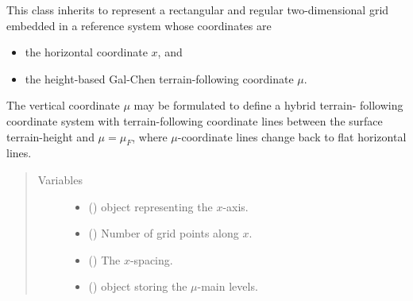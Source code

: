 \documentclass[letterpaper,10pt,english]{sphinxmanual}
\begin{document}
\begin{fulllineitems}
\label{\detokenize{api:grids.gal_chen.GalChen2d}}
This class inherits {\hyperref[\detokenize{api:grids.xz_grid.XZGrid}]{}} to represent a rectangular and regular
two-dimensional grid embedded in a reference system whose coordinates are
\begin{itemize}
\item {} 
the horizontal coordinate \(x\), and

\item {} 
the height-based Gal-Chen terrain-following coordinate \(\mu\).

\end{itemize}

The vertical coordinate \(\mu\) may be formulated to define a hybrid terrain-
following coordinate system with terrain-following coordinate lines between the
surface terrain-height and \(\mu = \mu_F\), where \(\mu\)-coordinate
lines change back to flat horizontal lines.
\begin{quote}\begin{description}
\item[{Variables}] \leavevmode\begin{itemize}
\item {} 
{\hyperref[\detokenize{api:grids.xyz_grid.XYZGrid.x}]{}} () \textendash{} {\hyperref[\detokenize{api:grids.axis.Axis}]{}} object representing the \(x\)-axis.

\item {} 
{\hyperref[\detokenize{api:grids.xyz_grid.XYZGrid.nx}]{}} () \textendash{} Number of grid points along \(x\).

\item {} 
{\hyperref[\detokenize{api:grids.xyz_grid.XYZGrid.dx}]{}} () \textendash{} The \(x\)-spacing.

\item {} 
 () \textendash{} {\hyperref[\detokenize{api:grids.axis.Axis}]{}} object storing the \(\mu\)-main levels.


\end{itemize}
\end{description}
\end{quote}
\end{fulllineitems}
\end{document}
